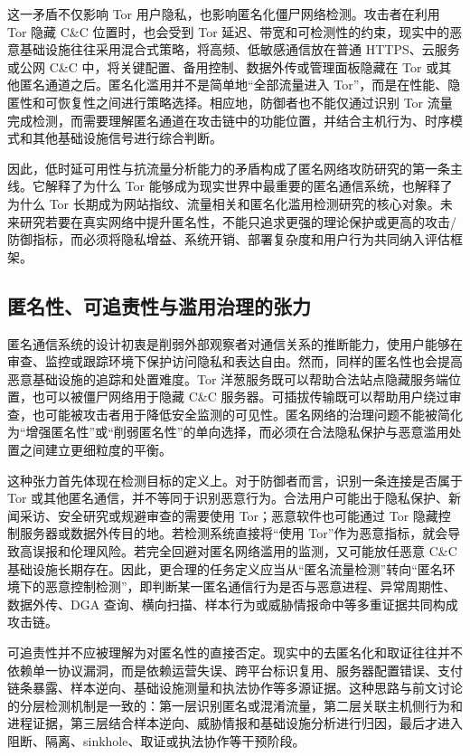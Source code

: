 这一矛盾不仅影响 Tor 用户隐私，也影响匿名化僵尸网络检测。攻击者在利用 Tor 隐藏 C\&C 位置时，也会受到 Tor 延迟、带宽和可检测性的约束，现实中的恶意基础设施往往采用混合式策略，将高频、低敏感通信放在普通 HTTPS、云服务或公网 C\&C 中，将关键配置、备用控制、数据外传或管理面板隐藏在 Tor 或其他匿名通道之后。匿名化滥用并不是简单地“全部流量进入 Tor”，而是在性能、隐匿性和可恢复性之间进行策略选择。相应地，防御者也不能仅通过识别 Tor 流量完成检测，而需要理解匿名通道在攻击链中的功能位置，并结合主机行为、时序模式和其他基础设施信号进行综合判断。

因此，低时延可用性与抗流量分析能力的矛盾构成了匿名网络攻防研究的第一条主线。它解释了为什么 Tor 能够成为现实世界中最重要的匿名通信系统，也解释了为什么 Tor 长期成为网站指纹、流量相关和匿名化滥用检测研究的核心对象。未来研究若要在真实网络中提升匿名性，不能只追求更强的理论保护或更高的攻击/防御指标，而必须将隐私增益、系统开销、部署复杂度和用户行为共同纳入评估框架。

\subsection{匿名性、可追责性与滥用治理的张力}

匿名通信系统的设计初衷是削弱外部观察者对通信关系的推断能力，使用户能够在审查、监控或跟踪环境下保护访问隐私和表达自由。然而，同样的匿名性也会提高恶意基础设施的追踪和处置难度。Tor 洋葱服务既可以帮助合法站点隐藏服务端位置，也可以被僵尸网络用于隐藏 C\&C 服务器。可插拔传输既可以帮助用户绕过审查，也可能被攻击者用于降低安全监测的可见性。匿名网络的治理问题不能被简化为“增强匿名性”或“削弱匿名性”的单向选择，而必须在合法隐私保护与恶意滥用处置之间建立更细粒度的平衡。

这种张力首先体现在检测目标的定义上。对于防御者而言，识别一条连接是否属于 Tor 或其他匿名通信，并不等同于识别恶意行为。合法用户可能出于隐私保护、新闻采访、安全研究或规避审查的需要使用 Tor；恶意软件也可能通过 Tor 隐藏控制服务器或数据外传目的地。若检测系统直接将“使用 Tor”作为恶意指标，就会导致高误报和伦理风险。若完全回避对匿名网络滥用的监测，又可能放任恶意 C\&C 基础设施长期存在。因此，更合理的任务定义应当从“匿名流量检测”转向“匿名环境下的恶意控制检测”，即判断某一匿名通信行为是否与恶意进程、异常周期性、数据外传、DGA 查询、横向扫描、样本行为或威胁情报命中等多重证据共同构成攻击链。

可追责性并不应被理解为对匿名性的直接否定。现实中的去匿名化和取证往往并不依赖单一协议漏洞，而是依赖运营失误、跨平台标识复用、服务器配置错误、支付链条暴露、样本逆向、基础设施测量和执法协作等多源证据。这种思路与前文讨论的分层检测机制是一致的：第一层识别匿名或混淆流量，第二层关联主机侧行为和进程证据，第三层结合样本逆向、威胁情报和基础设施分析进行归因，最后才进入阻断、隔离、sinkhole、取证或执法协作等干预阶段。

